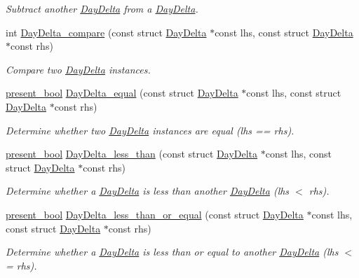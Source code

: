 \begin{DoxyCompactItemize}
\begin{DoxyCompactList}\small\item\em Subtract another \hyperlink{structDayDelta}{Day\-Delta} from a \hyperlink{structDayDelta}{Day\-Delta}. \end{DoxyCompactList}\item 
int \hyperlink{day-delta_8h_a9c2839c462e80f6419bb9e55f1744eab}{Day\-Delta\-\_\-compare} (const struct \hyperlink{structDayDelta}{Day\-Delta} $\ast$const lhs, const struct \hyperlink{structDayDelta}{Day\-Delta} $\ast$const rhs)
\begin{DoxyCompactList}\small\item\em Compare two \hyperlink{structDayDelta}{Day\-Delta} instances. \end{DoxyCompactList}\item 
\hyperlink{types_8h_a1c24e2cdd988b886e889080ded176ae0}{present\-\_\-bool} \hyperlink{day-delta_8h_aec7bbfd9ee83f64b94117028c4d856f5}{Day\-Delta\-\_\-equal} (const struct \hyperlink{structDayDelta}{Day\-Delta} $\ast$const lhs, const struct \hyperlink{structDayDelta}{Day\-Delta} $\ast$const rhs)
\begin{DoxyCompactList}\small\item\em Determine whether two \hyperlink{structDayDelta}{Day\-Delta} instances are equal (lhs == rhs). \end{DoxyCompactList}\item 
\hyperlink{types_8h_a1c24e2cdd988b886e889080ded176ae0}{present\-\_\-bool} \hyperlink{day-delta_8h_a47b5981aba0ded3368ade32fcf77e1fb}{Day\-Delta\-\_\-less\-\_\-than} (const struct \hyperlink{structDayDelta}{Day\-Delta} $\ast$const lhs, const struct \hyperlink{structDayDelta}{Day\-Delta} $\ast$const rhs)
\begin{DoxyCompactList}\small\item\em Determine whether a \hyperlink{structDayDelta}{Day\-Delta} is less than another \hyperlink{structDayDelta}{Day\-Delta} (lhs $<$ rhs). \end{DoxyCompactList}\item 
\hyperlink{types_8h_a1c24e2cdd988b886e889080ded176ae0}{present\-\_\-bool} \hyperlink{day-delta_8h_ad8c2d0d57be8633a7c47eaf7d5d018b0}{Day\-Delta\-\_\-less\-\_\-than\-\_\-or\-\_\-equal} (const struct \hyperlink{structDayDelta}{Day\-Delta} $\ast$const lhs, const struct \hyperlink{structDayDelta}{Day\-Delta} $\ast$const rhs)
\begin{DoxyCompactList}\small\item\em Determine whether a \hyperlink{structDayDelta}{Day\-Delta} is less than or equal to another \hyperlink{structDayDelta}{Day\-Delta} (lhs $<$= rhs). \end{DoxyCompactList}\item 

\end{DoxyCompactItemize}
